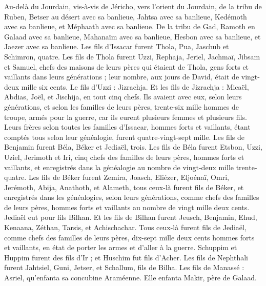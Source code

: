 \begin{multicols}{2}
Au-delà du Jourdain, vis-à-vis de Jéricho, vers l’orient du Jourdain, de la tribu de Ruben, Betser au désert avec sa banlieue, Jahtsa avec sa banlieue,
Kedémoth avec sa banlieue, et Méphaath avec sa banlieue.
De la tribu de Gad, Ramoth en Galaad avec sa banlieue, Mahanaïm avec sa banlieue,
Hesbon avec sa banlieue, et Jaezer avec sa banlieue.
\VerseOne{}Les fils d'Issacar furent  Thola, Pua, Jaschub et Schimron, quatre.
Les fils de Thola furent Uzzi, Rephaja, Jeriel, Jachmaï, Jibsam et Samuel, chefs des maisons de leurs pères qui étaient de Thola, gens forts et vaillants dans leurs générations ; leur nombre, aux jours de David, était de vingt-deux mille six cents.
Le fils d’Uzzi : Jizrachja. Et les fils de Jizrachja : Micaël, Abdias, Joël, et Jischija, en tout cinq chefs.
Ils avaient avec eux, selon leurs générations, et selon les familles de leurs pères, trente-six mille hommes de troupe, armés pour la guerre, car ils eurent plusieurs femmes et plusieurs fils.
Leurs frères selon toutes les familles d'Issacar, hommes forts et vaillants, étant comptés tous selon leur généalogie, furent quatre-vingt-sept mille.
Les fils de Benjamin furent Béla, Béker et Jediaël, trois.
Les fils de Béla furent  Etsbon, Uzzi, Uziel, Jerimoth et Iri, cinq chefs des familles de leurs pères, hommes forts et vaillants, et enregistrés dans la généalogie au nombre de vingt-deux mille trente-quatre.
Les fils de Béker furent  Zemira, Joasch, Eliézer, Eljoénaï, Omri, Jerémoth, Abija, Anathoth, et Alameth, tous ceux-là furent fils de Béker,
et enregistrés dans les généalogies, selon leurs générations, comme chefs des familles de leurs pères, hommes forts et vaillants au nombre de vingt mille deux cents.
Jediaël eut pour fils Bilhan. Et les fils de Bilhan furent Jeusch, Benjamin, Ehud, Kenaana, Zéthan, Tarsis, et Achischachar.
Tous ceux-là furent fils de Jediaël, comme chefs des familles de leurs pères, dix-sept mille deux cents hommes forts et vaillants, en état de porter les armes et d’aller à la guerre.
Schuppim et Huppim furent  des fils d’Ir ; et Huschim fut fils d'Acher.
Les fils de Nephthali furent Jahtsiel, Guni, Jetser, et Schallum, fils de Bilha.
Les fils de Manassé : Asriel, qu’enfanta sa concubine Araméenne. Elle enfanta Makir, père de Galaad.

\end{multicols}
